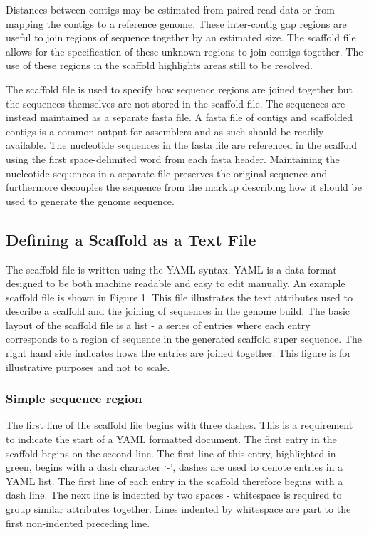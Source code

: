 \documentclass[10pt]{bmc_article}
\newenvironment{bmcformat}{\begin{raggedright}\baselineskip20pt\sloppy\setboolean{publ}{false}}{\end{raggedright}\baselineskip20pt\sloppy}
\begin{document}
\begin{bmcformat}
Distances between contigs may be estimated from paired read data or from
mapping the contigs to a reference genome. These inter-contig gap regions are
useful to join regions of sequence together by an estimated size. The scaffold
file allows for the specification of these unknown regions to join contigs
together. The use of these regions in the scaffold highlights areas still to be
resolved. \pb

The scaffold file is used to specify how sequence regions are joined together
but the sequences themselves are not stored in the scaffold file. The sequences
are instead maintained as a separate fasta file. A fasta file of contigs and
scaffolded contigs is a common output for assemblers and as such should be
readily available. The nucleotide sequences in the fasta file are referenced in
the scaffold using the first space-delimited word from each fasta header.
Maintaining the nucleotide sequences in a separate file preserves the original
sequence and furthermore decouples the sequence from the markup describing how
it should be used to generate the genome sequence. \pb

\subsection*{Defining a Scaffold as a Text File} %

The scaffold file is written using the YAML syntax. YAML is a data format
designed to be both machine readable and easy to edit manually. An example
scaffold file is shown in Figure 1. This file illustrates the text attributes
used to describe a scaffold and the joining of sequences in the genome build.
The basic layout of the scaffold file is a list - a series of entries where
each entry corresponds to a region of sequence in the generated scaffold super
sequence. The right hand side indicates hows the entries are joined together.
This figure is for illustrative purposes and not to scale. \pb

\subsubsection*{Simple sequence region} %

The first line of the scaffold file begins with three dashes. This is
a requirement to indicate the start of a YAML formatted document. The first
entry in the scaffold begins on the second line. The first line of this entry,
highlighted in green, begins with a dash character `-', dashes are used to
denote entries in a YAML list. The first line of each entry in the scaffold
therefore begins with a dash line. The next line is indented by two spaces
- whitespace is required to group similar attributes together. Lines indented
by whitespace are part to the first non-indented preceding line. \pb


\end{bmcformat}
\end{document}
